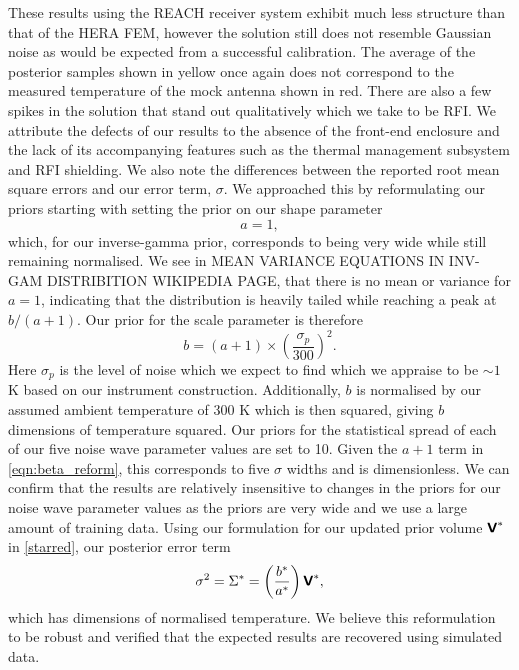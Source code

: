 These results using the REACH receiver system exhibit much less structure than that of the HERA FEM, however the solution still does not resemble Gaussian noise as would be expected from a successful calibration. The average of the posterior samples shown in yellow once again does not correspond to the measured temperature of the mock antenna shown in red. There are also a few spikes in the solution that stand out qualitatively which we take to be RFI. We attribute the defects of our results to the absence of the front-end enclosure and the lack of its accompanying features such as the thermal management subsystem and RFI shielding. We also note the differences between the reported root mean square errors and our error term, $\sigma$. We approached this by reformulating our priors starting with setting the prior on our shape parameter
\begin{equation}
    a = 1,
    \label{eqn:alpha_reform}
\end{equation}
which, for our inverse-gamma prior, corresponds to being very wide while still remaining normalised. We see in MEAN VARIANCE EQUATIONS IN INV-GAM DISTRIBITION WIKIPEDIA PAGE, that there is no mean or variance for $a=1$, indicating that the distribution is heavily tailed while reaching a peak at $b/(a + 1)$. Our prior for the scale parameter is therefore 
\begin{equation}
    b = \left(a + 1\right) \times \left(\frac{\sigma_{p}}{300}\right)^2.
    \label{eqn:beta_reform}
\end{equation}
Here $\sigma_{p}$ is the level of noise which we expect to find which we appraise to be $\sim 1$ K based on our instrument construction. Additionally, $b$ is normalised by our assumed ambient temperature of 300 K which is then squared, giving $b$ dimensions of temperature squared. Our priors for the statistical spread of each of our five noise wave parameter values are set to 10. Given the $a + 1$ term in \cref{eqn:beta_reform}, this corresponds to five $\sigma$ widths and is dimensionless. We can confirm that the results are relatively insensitive to changes in the priors for our noise wave parameter values as the priors are very wide and we use a large amount of training data. Using our formulation for our updated prior volume $\textbf{\textsf{V}}^*$ in \cref{starred}, our posterior error term
\begin{equation}
    \sigma^2 = \Sigma^* = \left( \frac{b^*}{a^*} \right) \textbf{\textsf{V}}^*,
    \label{eqn:sigma_reform}
\end{equation}
which has dimensions of normalised temperature. We believe this reformulation to be robust and verified that the expected results are recovered using simulated data.

